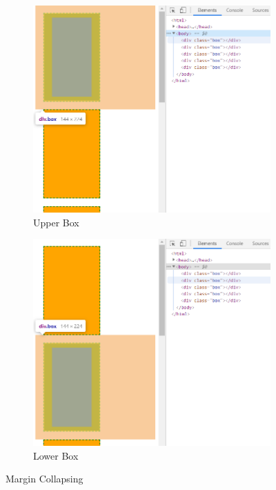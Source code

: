 \begin{figure}[htb]\vspace{10pt}\centering
    \begin{subfigure}{.42\textwidth}\centering
        \includegraphics[width=\textwidth]{images/css-designing-html/margin-collapsing-upper-box.png}
        \caption{Upper Box}
        \label{fig:margin-collapsing-upper}
    \end{subfigure}
    \begin{subfigure}{.42\textwidth}\centering
        \includegraphics[width=\textwidth]{images/css-designing-html/margin-collapsing-lower-box.png}
        \caption{Lower Box}
        \label{fig:margin-collapsing-lower}
    \end{subfigure}
    \caption{Margin Collapsing}
    \label{fig:margin-collapsing}
\end{figure}

